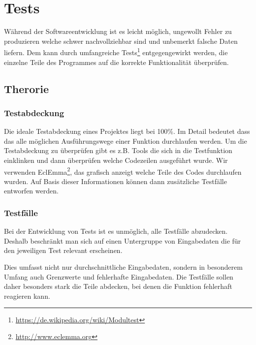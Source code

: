 

\section{Tests}

W\"ahrend der Softwareentwicklung ist es leicht m\"oglich, ungewollt Fehler zu produzieren welche schwer nachvollziehbar sind und unbemerkt falsche Daten liefern. Dem kann durch umfangreiche Tests\footnote{\url{https://de.wikipedia.org/wiki/Modultest}} entgegengewirkt werden, die einzelne Teile des Programmes auf die korrekte Funktionalit\"at \"uberpr\"ufen.

\subsection{Therorie}

\subsubsection{Testabdeckung}

Die ideale Testabdeckung eines Projektes liegt bei 100\%. Im Detail bedeutet dass das alle m\"oglichen Ausf\"uhrungswege einer Funktion durchlaufen werden. Um die Testabdeckung zu \"uberpr\"ufen gibt es z.B. Tools die sich in die Testfunktion einklinken und dann \"uberpr\"ufen welche Codezeilen ausgef\"uhrt wurde. Wir verwenden EclEmma\footnote{\url{http://www.eclemma.org}}, das grafisch anzeigt welche Teile des Codes durchlaufen wurden. Auf Basis dieser Informationen k\"onnen dann zus\"atzliche Testf\"alle entworfen werden.

\subsubsection{Testf\"alle}

Bei der Entwicklung von Tests ist es unm\"oglich, alle Testf\"alle abzudecken. Deshalb beschr\"ankt man sich auf einen Untergruppe von Eingabedaten die f\"ur den jeweiligen Test relevant erscheinen.

Dies umfasst nicht nur durchschnittliche Eingabedaten, sondern in besonderem Umfang auch Grenzwerte und fehlerhafte Eingabedaten. Die Testf\"alle sollen daher besonders stark die Teile abdecken, bei denen die Funktion fehlerhaft reagieren kann.

